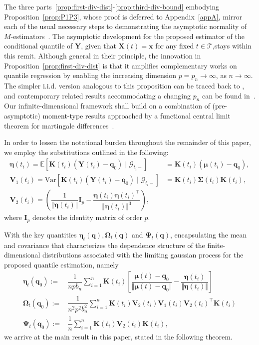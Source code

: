\documentclass[aos]{imsart}
\theoremstyle{plain}
\theoremstyle{remark}
\def\E{\mathbb{E}}
\newcommand{\Gcal}{\mathcal{G}}
\newcommand{\Tcal}{\mathcal{T}}
\newcommand{\bb}[1]{\boldsymbol{#1}}
\newcommand{\tr}{^{\intercal}}
\newcommand{\var}{\mathrm{Var}}
\newcommand{\cnam}[1]{\textcolor{mypurple}{#1}}
\begin{document}
The three parts~\ref{prop:first-div-dist}-\ref{prop:third-div-bound} embodying Proposition~\ref{prop:P1P3}, whose proof is deferred to Appendix~\ref{appA},  mirror each of the \cnam{usual} necessary steps to demonstrating the asymptotic normality of $M$-estimators~\citep[cf.][]{huber2011robust}. The asymptotic development for the proposed estimator of the conditional quantile of $\bb{Y}$, given that $\bb{X}(t) = \bb{x}$ for any fixed $t \in \Tcal$,\cnam{stays within this remit.} Although general in their principle, the innovation in \cnam{Proposition~\ref{prop:first-div-dist} is that it amplifies complementary works on quantile regression by enabling the increasing dimension $p=p_n \rightarrow \infty$, as $n \rightarrow \infty$. The simpler i.i.d. version analogous to this proposition} can be traced back to \cite{portnoy1986clt}, and contemporary related results accommodating a changing $p_n$ can be found in~\cite{das2020clt}. Our infinite-dimensional framework shall build on a combination of (pre-asymptotic) moment-type results approached by a functional central limit theorem for martingale differences~\citep[cf.][]{belloni2018high}.


In order to lessen the notational burden throughout the remainder of this paper, we \cnam{employ the substitutions outlined in the following:}
\begin{align}
    \bb{\eta}(t_i) = \E\left[ \bb{K}(t_i)(\bb{Y}(t_i) - \bb{q}_0) \mid \Gcal_{t_i-} \right] & = \bb{K}(t_i)\left( \bb{\mu}(t_i) - \bb{q}_0 \right),\label{eqn:notation-eta}\\
    \bb{V}_1(t_i) = \var\left[ \bb{K}(t_i)(\bb{Y}(t_i) - \bb{q}_0) \mid \Gcal_{t_i-} \right] & = \bb{K}(t_i) \bb{\Sigma}(t_i) \bb{K}(t_i),\label{eqn:notation-v1}\\
    \bb{V}_2(t_i) = \left( \dfrac{1}{\Vert \bb{\eta}(t_i) \Vert}\bb{I}_p - \dfrac{\bb{\eta}(t_i)\bb{\eta}(t_i)\tr}{\Vert \bb{\eta}(t_i)\Vert^3} \right),\label{eqn:notation-v2}
\end{align}
where $\bb{I}_p$ denotes the identity matrix of order $p$.


With the key quantities \cnam{ $\bb{\eta}_t(\bb{q}), \bb{\Omega}_t(\bb{q})$ and $\bb{\Psi}_t(\bb{q})$, encapsulating the mean and covariance that characterizes the dependence structure of the finite-dimensional distributions associated with the limiting gaussian process for the proposed quantile estimation, namely}
\begin{align}
    \bb{\eta}_t(\bb{q}_0) := & \dfrac{1}{npb_n}\sum_{i=1}^n \bb{K}(t_i) \left[ \dfrac{\bb{\mu}(t) - \bb{q}_0}{\Vert \bb{\mu}(t) - \bb{q}_0 \Vert} - \dfrac{\bb{\eta}(t_i)}{\Vert \bb{\eta}(t_i) \Vert} \right]\label{eqn:keydef-eta}\\
    \bb{\Omega}_t(\bb{q}_0) := & \dfrac{1}{n^2p^2b_n^2} \sum_{i=1}^n \bb{K}(t_i) \bb{V}_2(t_i)\bb{V}_1(t_i)\bb{V}_2(t_i)\tr \bb{K}(t_i)\label{eqn:keydef-omega}\\
    \bb{\Psi}_t(\bb{q}_0) := & \dfrac{1}{n}\sum_{i=1}^n \bb{K}(t_i) \bb{V}_2(t_i) \bb{K}(t_i)\label{eqn:keydef-psi},
\end{align}
we arrive at the main result in this paper, stated in the following theorem.
\end{document}
